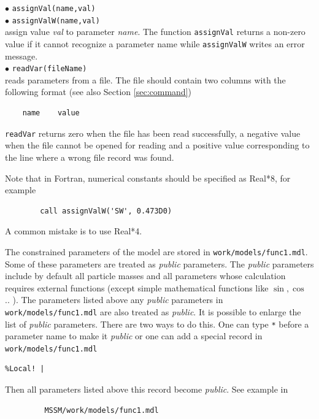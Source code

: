 \documentclass[12pt,a4paper]{article}
\begin{document}
\noindent
$\bullet$ \verb|assignVal(name,val)|\\
$\bullet$ \verb|assignValW(name,val)|\\
assign value {\it val} to parameter {\it name}. The function  \verb|assignVal| returns a non-zero
value  if it
cannot recognize  a parameter name while \verb|assignValW| writes an error message.  \\
$\bullet$ \verb|readVar(fileName)|\\
reads parameters from a file. The file  should contain two columns with the 
 following  format (see also Section \ref{sec:command})
\begin{verbatim}
    name    value
\end{verbatim}
\verb|readVar| returns zero when
the file has been read successfully, a negative value when the
file cannot be opened for reading and  a positive  value 
corresponding to the line where a wrong file record was found.

Note that in  Fortran, numerical constants should be specified as  Real*8, for example
\begin{verbatim}     
        call assignValW('SW', 0.473D0) 
\end{verbatim}
A common mistake is to use Real*4.  


The constrained parameters of the model are stored in \verb|work/models/func1.mdl|. Some of
these parameters are treated as {\it public} parameters. The {\it public} parameters include 
by default all particle masses 
and all parameters  whose calculation requires external functions (except simple
mathematical functions like $\sin,\cos$ .. ). The parameters
listed above any {\it public} parameters in  \verb|work/models/func1.mdl|
are also treated as {\it public}. 
It is possible to enlarge the list of {\it public} parameters. There are two ways to do this. 
One can type \verb|*| before a parameter name to make it {\it public} or one 
can add a  special record in \verb|work/models/func1.mdl|
\begin{verbatim}
%Local! |   
\end{verbatim}
Then all parameters listed above this record  become {\it public}. 
See example in
\begin{verbatim} 
         MSSM/work/models/func1.mdl 
\end{verbatim}
\end{document}
